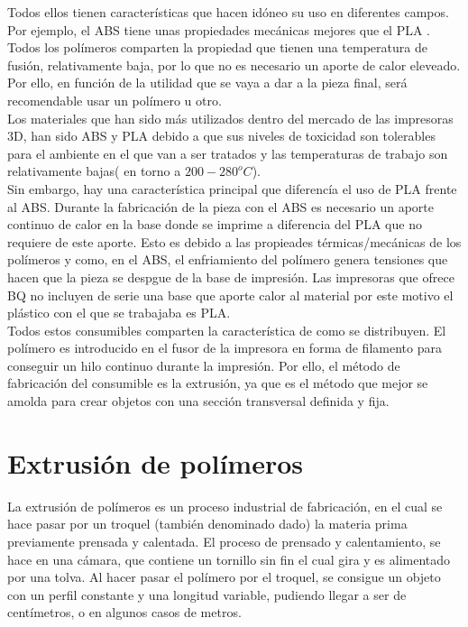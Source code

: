 Todos ellos tienen características que hacen idóneo su uso en diferentes campos. Por ejemplo, el ABS tiene unas propiedades mecánicas mejores que el PLA \cite{tfg_antonio}. Todos los polímeros comparten la propiedad que tienen una temperatura de fusión, relativamente baja, por lo que no es necesario un aporte de calor eleveado. Por ello, en función de la utilidad que se vaya a dar a la pieza final, será recomendable usar un polímero u otro.\\

Los materiales que han sido más utilizados dentro del mercado de las impresoras 3D, han sido ABS y PLA debido a que sus niveles de toxicidad son tolerables para el ambiente en el que van a ser tratados y las temperaturas de trabajo son relativamente bajas( en torno a $200-280 ^oC$).\\

Sin embargo, hay una característica principal que diferencía el uso de PLA frente al ABS. Durante la fabricación de la pieza con el ABS es necesario un aporte continuo de calor en la base donde se imprime a diferencia del PLA que no requiere de este aporte. Esto es debido a las propieades térmicas/mecánicas de los polímeros y como, en el ABS, el enfriamiento del polímero genera tensiones que hacen que la pieza se despgue de la base de impresión. Las impresoras que ofrece BQ no incluyen de serie una base que aporte calor al material por este motivo el plástico con el que se trabajaba es PLA.\\

Todos estos consumibles comparten la característica de como se distribuyen. El polímero es introducido en el fusor de la impresora en forma de filamento para conseguir un hilo continuo durante la impresión. Por ello, el método de fabricación del consumible es la extrusión, ya que es el método que mejor se amolda para crear objetos con una sección transversal definida y fija.\\

\section{Extrusión de polímeros}
\label{sec:extrusion}

La extrusión de polímeros es un proceso industrial de fabricación, en el cual se hace pasar por un troquel (también denominado dado) la materia prima previamente prensada y calentada. El proceso de prensado y calentamiento, se hace en una cámara, que contiene un tornillo sin fin el cual gira y es alimentado por una tolva. Al hacer pasar el polímero por el troquel, se consigue un objeto con un perfil constante y una longitud variable, pudiendo llegar a ser de centímetros, o en algunos casos de metros.\\

